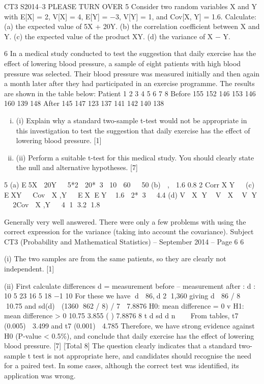 
CT3 S2014–3 PLEASE TURN OVER
5 Consider two random variables X and Y with E[X] = 2, V[X] = 4, E[Y] = −3, V[Y] = 1,
and Cov[X, Y] = 1.6.
Calculate:
(a) the expected value of 5X + 20Y.
(b) the correlation coefficient between X and Y.
(c) the expected value of the product XY.
(d) the variance of X − Y.

6 In a medical study conducted to test the suggestion that daily exercise has the effect of
lowering blood pressure, a sample of eight patients with high blood pressure was
selected. Their blood pressure was measured initially and then again a month later
after they had participated in an exercise programme. The results are shown in the
table below:
Patient 1 2 3 4 5 6 7 8
Before 155 152 146 153 146 160 139 148
After 145 147 123 137 141 142 140 138
\begin{enumerate}[(i)]
\item (i) Explain why a standard two-sample t-test would not be appropriate in this
investigation to test the suggestion that daily exercise has the effect of
lowering blood pressure. [1]
\item (ii) Perform a suitable t-test for this medical study. You should clearly state the
null and alternative hypotheses. [7]
\end{enumerate}

5 (a) E5X  20Y   5*2  20*3 10  60   50
(b)  ,  1.6 0.8
2
Corr X Y  
(c) EXY   Cov  X ,Y   EX EY  1.6  2*3  4.4
(d) V  X Y  V  X  V Y   2Cov  X ,Y   4 1 3.2 1.8

Generally very well answered. There were only a few problems with using the correct
expression for the variance (taking into account the covariance).
Subject CT3 (Probability and Mathematical Statistics) – September 2014 – %
Page 6
6 \item (i) The two samples are from the same patients, so they are clearly not
independent. [1]
\item (ii) First calculate differences d = measurement before – measurement after :
  d : 10 5 23 16 5 18 −1 10
For these we have d  86,d 2 1,360
giving d  86 / 8 10.75 and sd(d)  (1360 862 / 8) / 7  7.8876
H0: mean difference = 0 v H1: mean difference > 0
10.75 3.855
( ) 7.8876 8
t d
sd d n
  
From tables, t7 (0.005)  3.499 and t7 (0.001)  4.785
Therefore, we have strong evidence against H0 (P-value < 0.5\%), and
conclude that daily exercise has the effect of lowering blood pressure. [7]
[Total 8]
The question clearly indicates that a standard two-sample t
test is not appropriate here, and candidates should recognise the need for a paired test. In
some cases, although the correct test was identified, its application was wrong.

